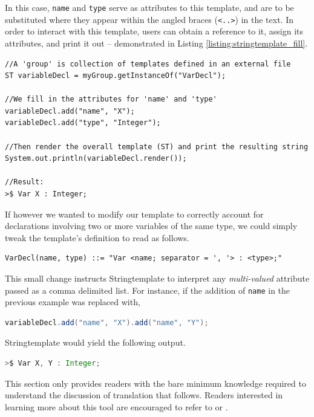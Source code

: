 \documentclass[times]{speauth}
\begin{document}
In this case, \texttt{name} and \texttt{type} serve as attributes to this template, and are to be substituted where they appear within the angled braces (\texttt{<..>}) in the text. In order to interact with this template, users can obtain a reference to it, assign its attributes, and print it out -- demonstrated in Listing \ref{listing:stringtemplate_fill}.

\begin{lstlisting}[caption={Basic template manipulation.},label={listing:stringtemplate_fill}]
//A 'group' is collection of templates defined in an external file
ST variableDecl = myGroup.getInstanceOf("VarDecl");

//We fill in the attributes for 'name' and 'type'
variableDecl.add("name", "X");
variableDecl.add("type", "Integer");		

//Then render the overall template (ST) and print the resulting string
System.out.println(variableDecl.render());

//Result:
>$ Var X : Integer;
\end{lstlisting}

If however we wanted to modify our template to correctly account for declarations involving two or more variables of the same type, we could simply tweak the template's definition to read as follows.

\begin{lstlisting}
VarDecl(name, type) ::= "Var <name; separator = ', '> : <type>;"
\end{lstlisting}

This small change instructs Stringtemplate to interpret any \textit{multi-valued} attribute passed as a comma delimited list. For instance, if the addition of \texttt{name} in the previous example was replaced with,

\begin{lstlisting}[language=java]
variableDecl.add("name", "X").add("name", "Y");
\end{lstlisting}	

Stringtemplate would yield the following output.
\begin{lstlisting}[language=java]
>$ Var X, Y : Integer;
\end{lstlisting}

This section only provides readers with the bare minimum knowledge required to understand the discussion of translation that follows. Readers interested in learning more about this tool are encouraged to refer to \cite{parr:2006} or \cite{parr:2004}.
\end{document}
